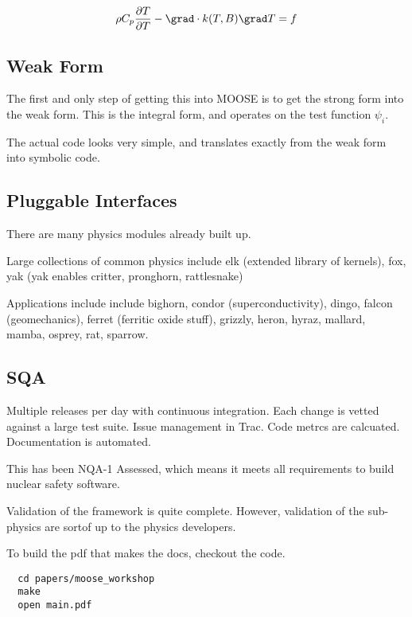 \begin{align}
  \rho C_p \frac{\partial T}{\partial T}- \grad \cdot k(T,B)\grad T = f
  \label{strongform}
\end{align}

\subsection{Weak Form}

The first and only step of getting this into MOOSE is to get the strong form 
into the weak form. This is the integral form, and operates on the test function 
$\psi_i$.

The actual code looks very simple, and translates exactly from the weak form 
into symbolic code. 


\subsection{Pluggable Interfaces}

There are many physics modules already built up. 

Large collections of common physics include elk (extended library of kernels), fox, yak (yak enables critter, pronghorn, rattlesnake)

Applications include include bighorn, condor (superconductivity), dingo, falcon (geomechanics), ferret (ferritic oxide stuff), grizzly, heron, hyraz, mallard, mamba, 
osprey, rat, sparrow.

\subsection{SQA}
Multiple releases per day with continuous integration. Each change is vetted 
against a large test suite. 
Issue management in Trac. 
Code metrcs are calcuated. 
Documentation is automated. 

This has been NQA-1 Assessed, which means it meets all requirements to build 
nuclear safety software. 


Validation of the framework is quite complete. However, validation of the 
sub-physics are sortof up to the physics developers. 







To build the pdf that makes the docs, checkout the code. 

\begin{verbatim}
  cd papers/moose_workshop
  make
  open main.pdf
\end{verbatim}

